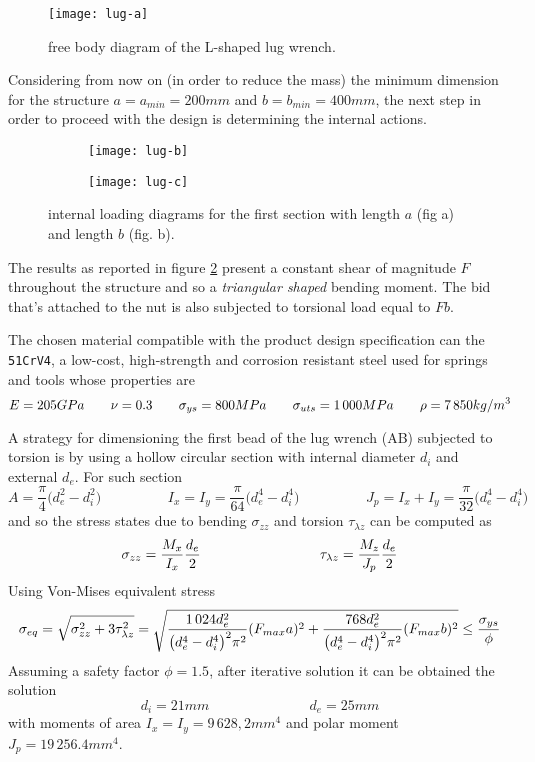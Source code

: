 	\begin{SCfigure}[1.5][b]
		\centering \texttt{[image: lug-a]}
		\caption{free body diagram of the L-shaped lug wrench.} \label{ex:lug-a}
	\end{SCfigure}
	
	Considering from now on (in order to reduce the mass) the minimum dimension for the structure $a = a_{min} = 200mm$ and $b = b_{min} = 400mm$, the next step in order to proceed with the design is determining the internal actions.	
	\begin{figure}[bt]
		\centering
		\begin{subfigure}{0.48\linewidth}
			\centering \texttt{[image: lug-b]} \caption{}
		\end{subfigure}
		\begin{subfigure}{0.48\linewidth}
			\centering \texttt{[image: lug-c]} \caption{}
		\end{subfigure}
		\caption{internal loading diagrams for the first section with length $a$ (fig a) and length $b$ (fig. b).} \label{ex:lug-b}
	\end{figure}
	The results as reported in figure \ref{ex:lug-b} present a constant shear of magnitude $F$ throughout the structure and so a \textit{triangular shaped} bending moment. The bid that's attached to the nut is also subjected to torsional load equal to $Fb$.
	
	The chosen material compatible with the product design specification can the \texttt{51CrV4}, a low-cost, high-strength and corrosion resistant steel used for springs and tools whose properties are
	\[ E = 205GPa \qquad \nu = 0.3 \qquad \sigma_{ys} = 800 MPa \qquad \sigma_{uts} = 1\,000 MPa \qquad \rho = 7\,850 kg/m^3  \]
	
	A strategy for dimensioning the first bead of the lug wrench (AB) subjected to torsion is by using a hollow circular section with internal diameter $d_i$ and external $d_e$. For such section
	\[ A = \frac\pi 4 \big(d_e^2-d_i^2\big) \hspace{2cm} I_x = I_y = \frac{\pi}{64} \big(d_e^4-d_i^4\big) \hspace{2cm} J_p = I_x + I_y = \frac \pi {32} \big(d_e^4-d_i^4\big) \] 
	and so the stress states due to bending $\sigma_{zz}$ and torsion $\tau_{\lambda z}$ can be computed as
	\[ \szz = \frac{M_x}{I_x} \frac{d_e}{2} \hspace{3cm} \tlz = \frac{M_z}{J_p} \frac {d_e}2 \]
	Using Von-Mises equivalent stress 
	\[ \sigma_{eq} = \sqrt{\sigma_{zz}^2 + 3\tau_{\lambda z}^2} = \sqrt{\frac{1\,024 d_e^2}{\big(d_e^4-d_i^4\big)^2 \pi^2} (F_{max}a)^2 + \frac{768 d_e^2}{\big(d_e^4-d_i^4\big)^2\pi^2} (F_{max}b)^2 } \leq \frac{\sigma_{ys}}{\phi} \]
	Assuming a safety factor $\phi = 1.5$, after iterative solution it can be obtained the solution
	\[ d_i = 21mm \hspace{3cm} d_e = 25mm \]
	with moments of area $I_x = I_y = 9\,628,2mm^4$ and polar moment $J_p = 19\,256.4mm^4$.
	
